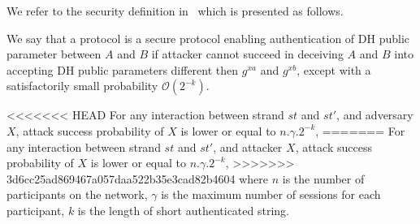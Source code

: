 We refer to the security definition in~\cite{1580514} which is presented as follows. 

\begin{Definition}
We say that a protocol is a secure protocol enabling authentication of DH public parameter between $A$ and $B$ if attacker cannot succeed in deceiving $A$ and $B$ into accepting DH public parameters different then $g^{xa}$ and $g^{xb}$, except with a satisfactorily small probability $\mathcal{O}(2^{-k})$.
\end{Definition}

\begin{Lemma}\label{lemme5.1}

<<<<<<< HEAD
For any interaction between strand $st$ and $st'$, and adversary $X$, attack success probability of $X$ is lower or equal to $n.\gamma.2^{-k}$, 
=======
For any interaction between strand $st$ and $st'$, and attacker $X$, attack success probability of $X$ is lower or equal to $n.\gamma.2^{-k}$, 
>>>>>>> 3d6cc25ad869467a057daa522b35e3cad82b4604
where $n$ is the number of participants on the network, $\gamma$ is the maximum number of sessions for each participant, $k$ is the length of short authenticated string. 
\end{Lemma}

